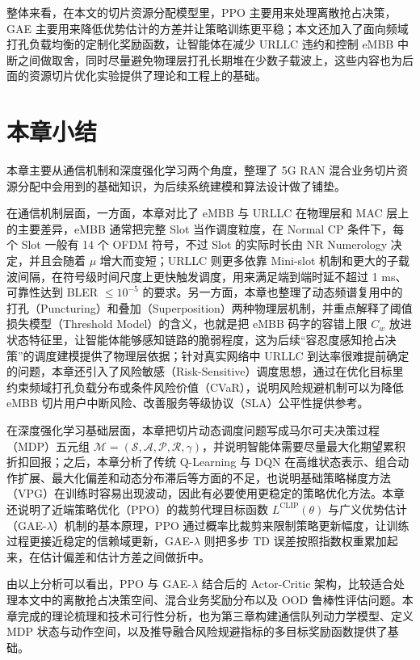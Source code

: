 整体来看，在本文的切片资源分配模型里，PPO 主要用来处理离散抢占决策，GAE 主要用来降低优势估计的方差并让策略训练更平稳；本文还加入了面向频域打孔负载均衡的定制化奖励函数，让智能体在减少 URLLC 违约和控制 eMBB 中断之间做取舍，同时尽量避免物理层打孔长期堆在少数子载波上，这些内容也为后面的资源切片优化实验提供了理论和工程上的基础。







\section{本章小结}


本章主要从通信机制和深度强化学习两个角度，整理了 5G RAN 混合业务切片资源分配中会用到的基础知识，为后续系统建模和算法设计做了铺垫。

在通信机制层面，一方面，本章对比了 eMBB 与 URLLC 在物理层和 MAC 层上的主要差异，eMBB 通常把完整 Slot 当作调度粒度，在 Normal CP 条件下，每个 Slot 一般有 14 个 OFDM 符号，不过 Slot 的实际时长由 NR Numerology 决定，并且会随着 $\mu$ 增大而变短；URLLC 则更多依靠 Mini-slot 机制和更大的子载波间隔，在符号级时间尺度上更快触发调度，用来满足端到端时延不超过 1 ms、可靠性达到 BLER $\leq 10^{-5}$ 的要求。另一方面，本章也整理了动态频谱复用中的打孔（Puncturing）和叠加（Superposition）两种物理层机制，并重点解释了阈值损失模型（Threshold Model）的含义，也就是把 eMBB 码字的容错上限 $C_w$ 放进状态特征里，让智能体能够感知链路的脆弱程度，这为后续“容忍度感知抢占决策”的调度建模提供了物理层依据；针对真实网络中 URLLC 到达率很难提前确定的问题，本章还引入了风险敏感（Risk-Sensitive）调度思想，通过在优化目标里约束频域打孔负载分布或条件风险价值（CVaR），说明风险规避机制可以为降低 eMBB 切片用户中断风险、改善服务等级协议（SLA）公平性提供参考。

在深度强化学习基础层面，本章把切片动态调度问题写成马尔可夫决策过程（MDP）五元组 $\mathcal{M} = (\mathcal{S}, \mathcal{A}, \mathcal{P}, \mathcal{R}, \gamma)$，并说明智能体需要尽量最大化期望累积折扣回报；之后，本章分析了传统 Q-Learning 与 DQN 在高维状态表示、组合动作扩展、最大化偏差和动态分布滞后等方面的不足，也说明基础策略梯度方法（VPG）在训练时容易出现波动，因此有必要使用更稳定的策略优化方法。本章还说明了近端策略优化（PPO）的裁剪代理目标函数 $L^{\mathrm{CLIP}}(\theta)$ 与广义优势估计（GAE-$\lambda$）机制的基本原理，PPO 通过概率比裁剪来限制策略更新幅度，让训练过程更接近稳定的信赖域更新，GAE-$\lambda$ 则把多步 TD 误差按照指数权重累加起来，在估计偏差和估计方差之间做折中。

由以上分析可以看出，PPO 与 GAE-$\lambda$ 结合后的 Actor-Critic 架构，比较适合处理本文中的离散抢占决策空间、混合业务奖励分布以及 OOD 鲁棒性评估问题。本章完成的理论梳理和技术可行性分析，也为第三章构建通信队列动力学模型、定义 MDP 状态与动作空间，以及推导融合风险规避指标的多目标奖励函数提供了基础。

